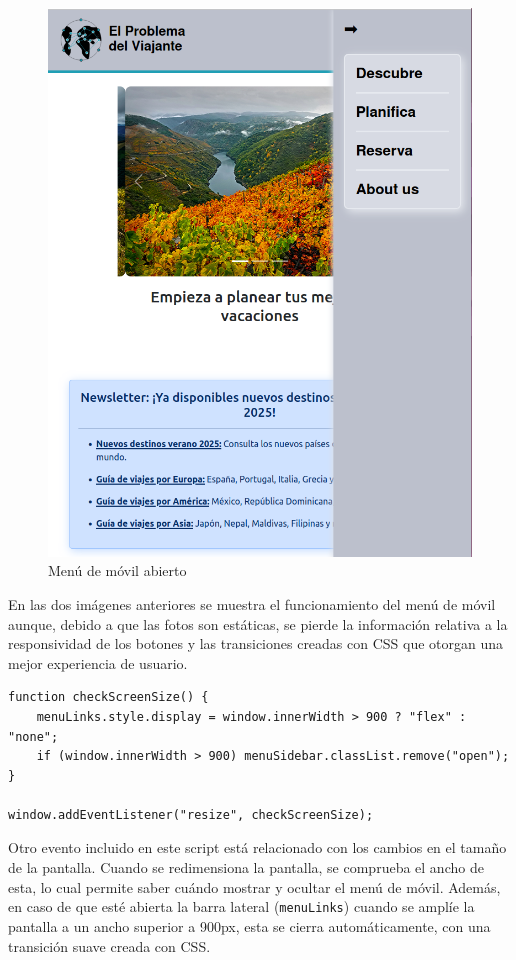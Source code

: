 \documentclass[11pt, a4paper]{book}
\begin{document}
	\begin{figure} [H]
		\centering
		\includegraphics[height=0.4\textheight]{CSS/1 extra1.png}
		\caption{Menú de móvil abierto}
	\end{figure}

	En las dos imágenes anteriores se muestra el funcionamiento del menú de móvil aunque, debido a que las fotos son estáticas, se pierde la información relativa a la responsividad de los botones y las transiciones creadas con CSS que otorgan una mejor experiencia de usuario.
	
	\begin{lstlisting}
function checkScreenSize() {
	menuLinks.style.display = window.innerWidth > 900 ? "flex" : "none";
	if (window.innerWidth > 900) menuSidebar.classList.remove("open");
}

window.addEventListener("resize", checkScreenSize);
	\end{lstlisting}

	Otro evento incluido en este script está relacionado con los cambios en el tamaño de la pantalla. Cuando se redimensiona la pantalla, se comprueba el ancho de esta, lo cual permite saber cuándo mostrar y ocultar el menú de móvil. Además, en caso de que esté abierta la barra lateral (\texttt{menuLinks}) cuando se amplíe la pantalla a un ancho superior a 900px, esta se cierra automáticamente, con una transición suave creada con CSS.
	
\end{document}
